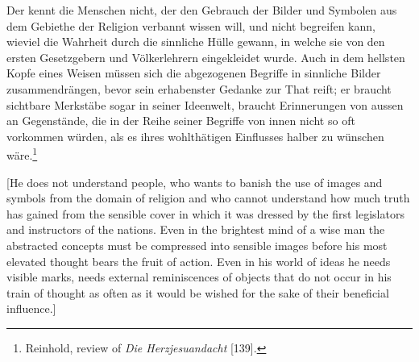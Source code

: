 Der kennt die Menschen nicht, der den Gebrauch der Bilder und Symbolen aus dem Gebiethe der Religion verbannt wissen will, und nicht begreifen kann, wieviel die Wahrheit durch die sinnliche H\"{u}lle gewann, in welche sie von den ersten Gesetzgebern und V\"{o}lkerlehrern eingekleidet wurde. Auch in dem hellsten Kopfe eines Weisen m\"{u}ssen sich die abgezogenen Begriffe in sinnliche Bilder zusammendr\"{a}ngen, bevor sein erhabenster Gedanke zur That reift; er braucht sichtbare Merkst\"{a}be sogar in seiner Ideenwelt, braucht Erinnerungen von aussen an Gegenst\"{a}nde, die in der Reihe seiner Begriffe von innen nicht so oft vorkommen w\"{u}rden, als es ihres wohlth\"{a}tigen Einflusses halber zu w\"{u}nschen w\"{a}re.\footnote{ Reinhold, review of \textit{Die Herzjesuandacht }[139].}

[He does not understand people, who wants to banish the use of images and symbols from the domain of religion and who cannot understand how much truth has gained from the sensible cover in which it was dressed by the first legislators and instructors of the nations. Even in the brightest mind of a wise man the abstracted concepts must be compressed into sensible images before his most elevated thought bears the fruit of action. Even in his world of ideas he needs visible marks, needs external reminiscences of objects that do not occur in his train of thought as often as it would be wished for the sake of their beneficial influence.]

